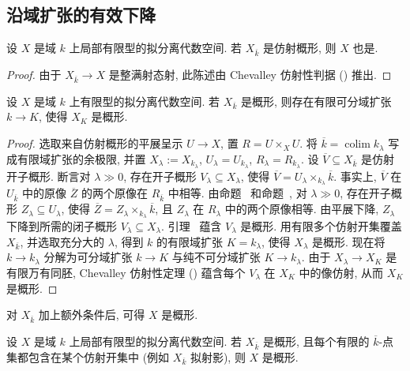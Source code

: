 \subsection{沿域扩张的有效下降}\label{src:5.5.5-subsection}
\begin{lemma}\label{src:5.5.25}
设 $X$ 是域 $k$ 上局部有限型的拟分离代数空间. 若 $X_{\overline k}$ 是仿射概形, 则 $X$ 也是.
\end{lemma}
\begin{proof}
由于 $X_{\overline k}\to X$ 是整满射态射, 此陈述由 Chevalley 仿射性判据 () 推出.
\end{proof}
\begin{proposition}\label{src:5.5.26}
设 $X$ 是域 $k$ 上有限型的拟分离代数空间. 若 $X_{\overline k}$ 是概形, 则存在有限可分域扩张 $k\to K$, 使得 $X_K$ 是概形.
\end{proposition}
\begin{proof}
选取来自仿射概形的平展呈示 $U\to X$, 置 $R=U\times_X U$. 将 $\overline k=\operatorname{colim}k_\lambda$ 写成有限域扩张的余极限, 并置 $X_\lambda:=X_{k_\lambda}$, $U_\lambda=U_{k_\lambda}$, $R_\lambda=R_{k_\lambda}$. 设 $\overline V\subseteq X_{\overline k}$ 是仿射开子概形. 断言对 $\lambda\gg0$, 存在开子概形 $V_\lambda\subseteq X_\lambda$, 使得 $\overline V=U_\lambda\times_{k_\lambda}\overline k$. 事实上, $\overline V$ 在 $U_{\overline k}$ 中的原像 $\overline Z$ 的两个原像在 $R_{\overline k}$ 中相等. 由命题~ 和命题~, 对 $\lambda\gg0$, 存在开子概形 $Z_\lambda\subseteq U_\lambda$, 使得 $\overline Z=Z_\lambda\times_{k_\lambda}\overline k$, 且 $Z_\lambda$ 在 $R_\lambda$ 中的两个原像相等. 由平展下降, $Z_\lambda$ 下降到所需的闭子概形 $V_\lambda\subseteq X_\lambda$. 引理~ 蕴含 $V_\lambda$ 是概形. 用有限多个仿射开集覆盖 $X_{\overline k}$, 并选取充分大的 $\lambda$, 得到 $k$ 的有限域扩张 $K=k_\lambda$, 使得 $X_\lambda$ 是概形. 现在将 $k\to k_\lambda$ 分解为可分域扩张 $k\to K$ 与纯不可分域扩张 $K\to k_\lambda$. 由于 $X_\lambda\to X_K$ 是有限万有同胚, Chevalley 仿射性定理 () 蕴含每个 $V_\lambda$ 在 $X_K$ 中的像仿射, 从而 $X_K$ 是概形.
\end{proof}
对 $X_{\overline k}$ 加上额外条件后, 可得 $X$ 是概形.
\begin{proposition}\label{src:5.5.27}
设 $X$ 是域 $k$ 上局部有限型的拟分离代数空间. 若 $X_{\overline k}$ 是概形, 且每个有限的 $\overline k$-点集都包含在某个仿射开集中 (例如 $X_{\overline k}$ 拟射影), 则 $X$ 是概形.
\end{proposition}
